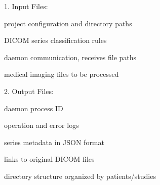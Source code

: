 \documentclass[letterpaper,10pt,english]{sphinxmanual}
\begin{document}
\sphinxAtStartPar
{}


\sphinxAtStartPar
{}

\begin{DUlineblock}{0em}
\item[] 1. Input Files:
\end{DUlineblock}

\begin{DUlineblock}{0em}
\item[] \sphinxhyphen{}  \sphinxhyphen{} project configuration and directory paths
\item[] \sphinxhyphen{}  \sphinxhyphen{} DICOM series classification rules
\item[] \sphinxhyphen{}  \sphinxhyphen{} daemon communication, receives file paths
\item[] \sphinxhyphen{}  \sphinxhyphen{} medical imaging files to be processed
\end{DUlineblock}

\begin{DUlineblock}{0em}
\item[] 2. Output Files:
\end{DUlineblock}

\begin{DUlineblock}{0em}
\item[] \sphinxhyphen{}  \sphinxhyphen{} daemon process ID
\item[] \sphinxhyphen{}  \sphinxhyphen{} operation and error logs
\item[] \sphinxhyphen{}  \sphinxhyphen{} series metadata in JSON format
\item[] \sphinxhyphen{}  \sphinxhyphen{} links to original DICOM files
\item[] \sphinxhyphen{}  \sphinxhyphen{} directory structure organized by patients/studies
\end{DUlineblock}

\sphinxAtStartPar
{}
\end{document}
